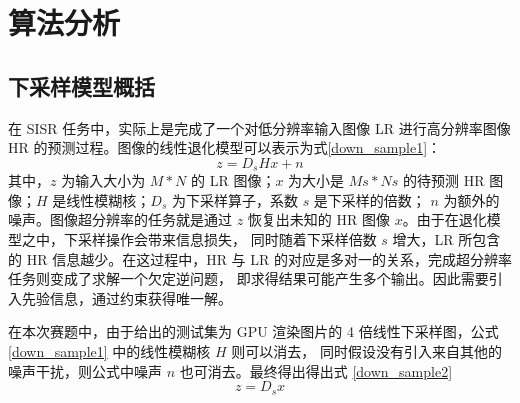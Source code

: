 \documentclass[12pt, a4paper, oneside]{ctexbook}
\begin{document}
	
	\chapter{算法分析}
	\section{下采样模型概括}
	在 SISR 任务中，实际上是完成了一个对低分辨率输入图像 LR 进行高分辨率图像 HR 的预测过程。图像的线性退化模型可以表示为式\ref{down_sample1}：
	\begin{equation}
		z=D_sHx + n \label{down_sample1}
	\end{equation}
	其中，$z$ 为输入大小为 $M*N$ 的 LR 图像；$x$ 为大小是 $Ms*Ns$ 的待预测 HR 图像；$H$ 是线性模糊核；$D_s$ 为下采样算子，系数 $s$ 是下采样的倍数； 
	$n$ 为额外的噪声。图像超分辨率的任务就是通过 $z$ 恢复出未知的 HR 图像 $x$。由于在退化模型之中，下采样操作会带来信息损失，
	同时随着下采样倍数 $s$ 增大，LR 所包含的 HR 信息越少。在这过程中，HR 与 LR 的对应是多对一的关系，完成超分辨率任务则变成了求解一个欠定逆问题，
	即求得结果可能产生多个输出。因此需要引入先验信息，通过约束获得唯一解。
	\par 在本次赛题中，由于给出的测试集为 GPU 渲染图片的 4 倍线性下采样图，公式 \ref{down_sample1} 中的线性模糊核 $H$ 则可以消去，
	同时假设没有引入来自其他的噪声干扰，则公式中噪声 $n$ 也可消去。最终得出得出式 \ref{down_sample2}
	\begin{equation}
		z=D_sx \label{down_sample2}
	\end{equation}
	
\end{document}
